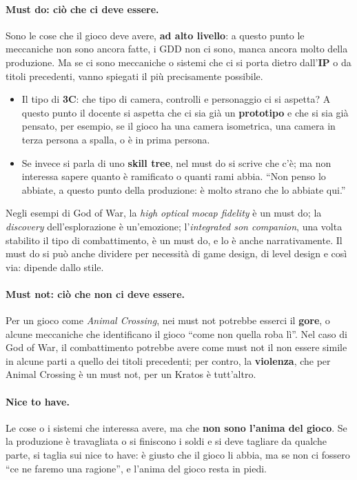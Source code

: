 \paragraph{Must do: ciò che ci deve essere.} Sono le cose che il gioco deve
avere, \textbf{ad alto livello}: a questo punto le meccaniche non sono ancora
fatte, i GDD non ci sono, manca ancora molto della produzione. Ma se ci sono
meccaniche o sistemi che ci si porta dietro dall'\textbf{IP} o da titoli
precedenti, vanno spiegati il più precisamente possibile.
\begin{itemize}
  \item Il tipo di \textbf{3C}: che tipo di camera, controlli e personaggio
        ci si aspetta? A questo punto il docente si aspetta che ci sia già
        un \textbf{prototipo} e che si sia già pensato, per esempio, se il
        gioco ha una camera isometrica, una camera in terza persona a spalla,
        o è in prima persona.
  \item Se invece si parla di uno \textbf{skill tree}, nel must do si scrive
        che c'è; ma non interessa sapere quanto è ramificato o quanti rami
        abbia. ``Non penso lo abbiate, a questo punto della produzione: è
        molto strano che lo abbiate qui.''
\end{itemize}
Negli esempi di God of War, la \emph{high optical mocap fidelity} è un must
do; la \emph{discovery} dell'esplorazione è un'emozione; l'\emph{integrated
son companion}, una volta stabilito il tipo di combattimento, è un must do, e
lo è anche narrativamente. Il must do si può anche dividere per necessità di
game design, di level design e così via: dipende dallo stile.

\paragraph{Must not: ciò che non ci deve essere.} Per un gioco come
\emph{Animal Crossing}, nei must not potrebbe esserci il \textbf{gore}, o
alcune meccaniche che identificano il gioco ``come non quella roba lì''. Nel
caso di God of War, il combattimento potrebbe avere come must not il non
essere simile in alcune parti a quello dei titoli precedenti; per contro, la
\textbf{violenza}, che per Animal Crossing è un must not, per un Kratos è
tutt'altro.

\paragraph{Nice to have.} Le cose o i sistemi che interessa avere, ma che
\textbf{non sono l'anima del gioco}. Se la produzione è travagliata o si
finiscono i soldi e si deve tagliare da qualche parte, si taglia sui nice to
have: è giusto che il gioco li abbia, ma se non ci fossero ``ce ne faremo una
ragione'', e l'anima del gioco resta in piedi.

